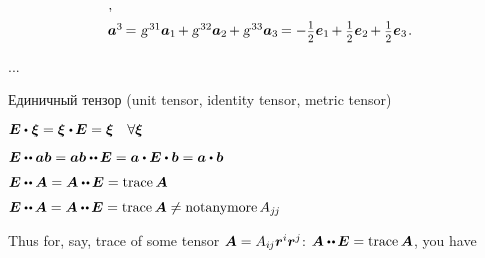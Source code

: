 \begin{otherlanguage}{russian}
\begin{tcolorbox}
\[\begin{array}{l}
\hspace{.1ex} ,
\\[.5em]
%
\bm{a}^3 \hspace{-0.2ex}=\hspace{.1ex} \textsl{g}^{\hspace{.2ex}31} \bm{a}_1 \hspace{-0.2ex} + \textsl{g}^{\hspace{.2ex}32} \bm{a}_2 \hspace{-0.2ex} + \textsl{g}^{\hspace{.2ex}33} \bm{a}_3 \hspace{-0.2ex} = - \smalldisplaystyleonehalf \bm{e}_1 \hspace{-0.2ex} + \smalldisplaystyleonehalf \bm{e}_2 \hspace{-0.2ex} + \smalldisplaystyleonehalf \bm{e}_3
\hspace{.16ex} .
\end{array}\]

\par\end{tcolorbox}

...


Единичный тензор
(unit tensor, identity tensor, metric tensor)

$\UnitDyad \dotp \hspace{.1ex} \bm{\xi} = \bm{\xi} \hspace{.1ex} \dotp \hspace{-0.12ex} \UnitDyad = \bm{\xi} \quad \forall \bm{\xi}$

$\UnitDyad \dotdotp \bm{a} \bm{b} = \bm{a} \bm{b} \dotdotp \hspace{-0.12ex} \UnitDyad = \bm{a} \dotp \UnitDyad \dotp \bm{b} = \bm{a} \dotp \bm{b}$

$\UnitDyad \dotdotp \bm{A} = \bm{A} \dotdotp \hspace{-0.12ex} \UnitDyad = \trace{\hspace{-0.1ex}\bm{A}}$

$\UnitDyad \dotdotp \hspace{-0.1ex} \bm{A} = \bm{A} \dotdotp \hspace{-0.12ex} \UnitDyad = \trace{\hspace{-0.1ex}\bm{A}} \neq \operatorname{not anymore} A_{j\hspace{-0.12ex}j}$

Thus for, say, trace of some tensor ${\bm{A} = A_{i\hspace{-0.1ex}j} \bm{r}^i \bm{r}^j}$: ${\bm{A} \dotdotp \hspace{-0.12ex} \UnitDyad = \trace{\hspace{-0.1ex}\bm{A}}}$, you have


\end{otherlanguage}

